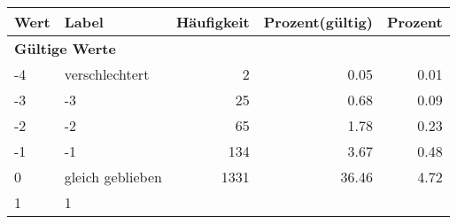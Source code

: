      \begin{longtable}{lXrrr}
     \toprule
     \textbf{Wert} & \textbf{Label} & \textbf{Häufigkeit} & \textbf{Prozent(gültig)} & \textbf{Prozent} \\
     \endhead
     \midrule
     \multicolumn{5}{l}{\textbf{Gültige Werte}}\\

     -4 &
     \multicolumn{1}{X}{ verschlechtert   } &


       \num{2} &
       \num[round-mode=places,round-precision=2]{0.05} &
         \num[round-mode=places,round-precision=2]{0.01} \\

     -3 &
     \multicolumn{1}{X}{ -3   } &


       \num{25} &
       \num[round-mode=places,round-precision=2]{0.68} &
         \num[round-mode=places,round-precision=2]{0.09} \\

     -2 &
     \multicolumn{1}{X}{ -2   } &


       \num{65} &
       \num[round-mode=places,round-precision=2]{1.78} &
         \num[round-mode=places,round-precision=2]{0.23} \\

     -1 &
     \multicolumn{1}{X}{ -1   } &


       \num{134} &
       \num[round-mode=places,round-precision=2]{3.67} &
         \num[round-mode=places,round-precision=2]{0.48} \\

     0 &
     \multicolumn{1}{X}{ gleich geblieben   } &


       \num{1331} &
       \num[round-mode=places,round-precision=2]{36.46} &
         \num[round-mode=places,round-precision=2]{4.72} \\

     1 &
     \multicolumn{1}{X}{ 1   } &



\end{longtable}
